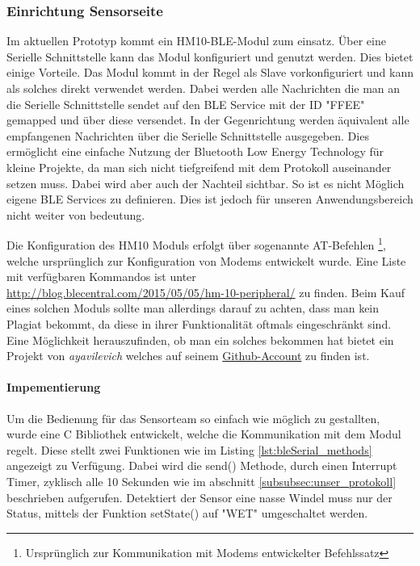 \subsubsection{Einrichtung Sensorseite}
Im aktuellen Prototyp kommt ein HM10-BLE-Modul zum einsatz. Über eine Serielle Schnittstelle kann das Modul konfiguriert und genutzt werden. Dies bietet einige Vorteile. Das Modul kommt in der Regel als Slave vorkonfiguriert und kann als solches direkt verwendet werden. Dabei werden alle Nachrichten die man an die Serielle Schnittstelle sendet auf den BLE Service mit der ID "FFEE" gemapped und über diese versendet. In der Gegenrichtung werden äquivalent alle empfangenen Nachrichten über die Serielle Schnittstelle ausgegeben. Dies ermöglicht eine einfache Nutzung der Bluetooth Low Energy Technology für kleine Projekte, da man sich nicht tiefgreifend mit dem Protokoll auseinander setzen muss. Dabei wird aber auch der Nachteil sichtbar. So ist es nicht Möglich eigene BLE Services zu definieren. Dies ist jedoch für unseren Anwendungsbereich nicht weiter von bedeutung. 

Die Konfiguration des HM10 Moduls erfolgt über sogenannte AT-Befehlen \footnote{Ursprünglich zur Kommunikation mit Modems entwickelter Befehlssatz}, welche ursprünglich zur Konfiguration von Modems entwickelt wurde. Eine Liste mit verfügbaren Kommandos ist unter \url{http://blog.blecentral.com/2015/05/05/hm-10-peripheral/} zu finden. Beim Kauf eines solchen Moduls sollte man allerdings darauf zu achten, dass man kein Plagiat bekommt, da diese in ihrer Funktionalität oftmals eingeschränkt sind. Eine Möglichkeit herauszufinden, ob man ein solches bekommen hat bietet ein Projekt von \textit{ayavilevich} welches auf seinem \href{https://github.com/ayavilevich/arduino-ble-ident-n-set}{Github-Account} zu finden ist.

\paragraph{Impementierung}
Um die Bedienung für das Sensorteam so einfach wie möglich zu gestallten, wurde eine C Bibliothek entwickelt, welche die Kommunikation mit dem Modul regelt. Diese stellt zwei Funktionen wie im Listing \ref{lst:bleSerial_methods} angezeigt zu Verfügung. Dabei wird die send() Methode, durch einen Interrupt Timer, zyklisch alle 10 Sekunden wie im abschnitt \ref{subsubsec:unser_protokoll} beschrieben aufgerufen. Detektiert der Sensor eine nasse Windel muss nur der Status, mittels der Funktion setState() auf "WET" umgeschaltet werden.

